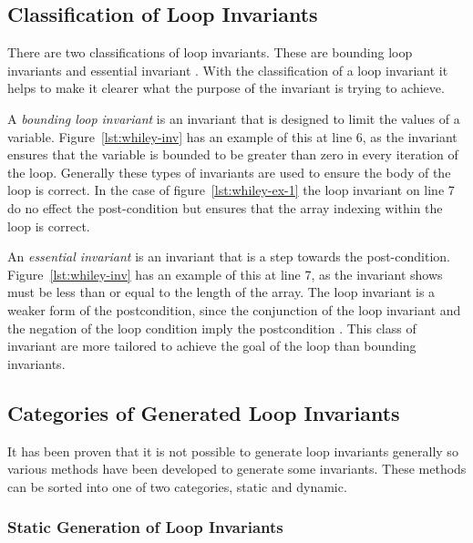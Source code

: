 \subsection{Classification of Loop Invariants}

There are two classifications of loop invariants.
These are bounding loop invariants and essential invariant
\cite{invarints-classifiction}.
With the classification of a loop invariant it helps to make
it clearer what the purpose of the invariant is trying to achieve.

A \textit{bounding loop invariant} is an invariant that is designed
to limit the values of a variable.
Figure~\ref{lst:whiley-inv} has an example of this at line 6, as the invariant
ensures that the variable  is bounded to be greater than zero
in every iteration of the loop.
Generally these types of invariants are used to ensure the body of the loop
is correct. In the case of figure~\ref{lst:whiley-ex-1} the loop invariant on line
7 do no effect the post-condition but ensures that the array indexing within
the loop is correct.

An \textit{essential invariant} is an invariant that is a step towards the
post-condition.
Figure~\ref{lst:whiley-inv} has an example of this at line 7,
as the invariant shows  must be less than or
equal to the length of the  array.
The loop invariant is a weaker form of the postcondition,
since the conjunction of the loop invariant and the negation
of the loop condition imply the postcondition \cite{invarints-classifiction}.
This class of invariant are more tailored to achieve
the goal of the loop than bounding invariants.

\subsection{Categories of Generated Loop Invariants}

It has been proven that it is not possible to generate loop invariants
generally %
so various methods have been developed to generate some invariants.
These methods can be sorted into one of two categories, static and dynamic.

\subsubsection{Static Generation of Loop Invariants}

